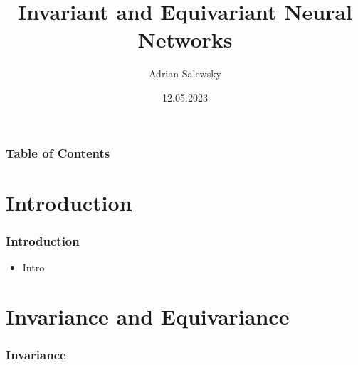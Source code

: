\documentclass{beamer}
\title{Invariant and Equivariant Neural Networks}
\author[Adrian Salewsky]{Adrian Salewsky}
\institute{Technische Universität Berlin}
\date{12.05.2023}
\begin{document}
\frame{\titlepage}

\begin{frame}
\frametitle{Table of Contents}
\tableofcontents
\end{frame}

\section{Introduction} 
\begin{frame}
\frametitle{Introduction}
\begin{itemize}
\item<2-> Intro
\end{itemize}
\end{frame}


\section{Invariance and Equivariance}
\begin{frame}
\frametitle{Invariance}
\begin{figure}[h]
\end{figure}
\end{frame}
\end{document}
